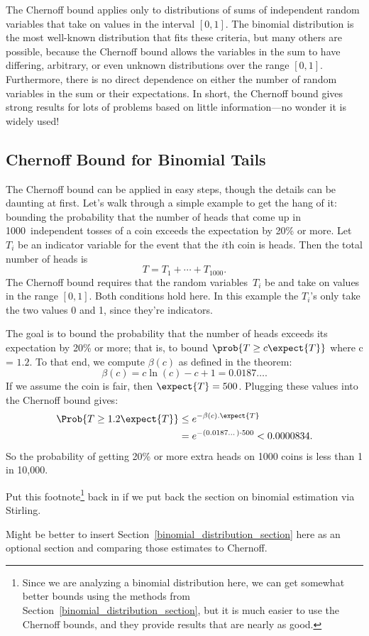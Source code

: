 The Chernoff bound applies only to distributions of sums of
independent random variables that take on values in the interval $[0,
  1]$.  The binomial distribution is the most well-known distribution
that fits these criteria, but many others are possible, because the
Chernoff bound allows the variables in the sum to have differing,
arbitrary, or even unknown distributions over the range $[0, 1]$.
Furthermore, there is no direct dependence on either the number of
random variables in the sum or their expectations.  In short, the
Chernoff bound gives strong results for lots of problems based on
little information---no wonder it is widely used!

\subsection{Chernoff Bound for Binomial Tails}

The Chernoff bound can be applied in easy steps, though the details
can be daunting at first.  Let's walk through a simple example to get
the hang of it: bounding the probability that the number of heads that
come up in 1000~independent tosses of a coin exceeds the expectation
by 20\% or more.  Let $T_i$ be an indicator variable for the event
that the $i$th coin is heads.  Then the total number of heads is
\begin{equation*}
    T = T_1 + \cdots + T_{1000}.
\end{equation*}
The Chernoff bound requires that the random variables~$T_i$ be
 and take on values in the range $[0, 1]$.
Both conditions hold here.  In this example the $T_i$'s only take the two
values 0 and 1, since they're indicators.

The goal is to bound the probability that the number of heads exceeds
its expectation by 20\% or more; that is, to bound $\prob{T \geq c
  \expect{T}}$ where c = $1.2$.  To that end, we compute $\beta(c)$ as
defined in the theorem:
\[
\beta(c) = c \ln(c) - c + 1 = 0.0187\dots.
\]
If we assume the coin is fair, then $\expect{T} = 500$.
Plugging these values into the Chernoff bound gives:
\begin{align*}
\Prob{T \geq 1.2 \expect{T}} & \leq  e^{- \beta(c). \expect{T}} \\
  & = e^{- (0.0187\dots) \cdot 500} <  0.0000834.
\end{align*}
So the probability of getting 20\% or more extra heads on 1000 coins
is less than 1 in 10,000.

\begin{editingnotes}
Put this footnote\footnote{Since we are analyzing a binomial
  distribution here, we can get somewhat better bounds using the
  methods from Section~\ref{binomial_distribution_section}, but it is
  much easier to use the Chernoff bounds, and they provide results
  that are nearly as good.} back in if we put back the section on binomial estimation
via Stirling.

Might be better to insert Section~\ref{binomial_distribution_section}
here as an optional section and comparing those estimates to
Chernoff.
\end{editingnotes}

